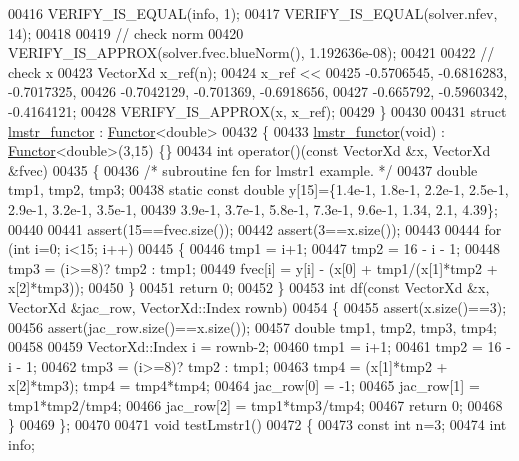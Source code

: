 \begin{DoxyCode}
00416   VERIFY\_IS\_EQUAL(info, 1);
00417   VERIFY\_IS\_EQUAL(solver.nfev, 14);
00418 
00419   \textcolor{comment}{// check norm}
00420   VERIFY\_IS\_APPROX(solver.fvec.blueNorm(), 1.192636e-08);
00421 
00422   \textcolor{comment}{// check x}
00423   VectorXd x\_ref(n);
00424   x\_ref <<
00425       -0.5706545,    -0.6816283,    -0.7017325,
00426       -0.7042129,     -0.701369,    -0.6918656,
00427       -0.665792,    -0.5960342,    -0.4164121;
00428   VERIFY\_IS\_APPROX(x, x\_ref);
00429 \}
00430 
00431 \textcolor{keyword}{struct }\hyperlink{structlmstr__functor}{lmstr\_functor} : \hyperlink{struct_functor}{Functor}<double>
00432 \{
00433     \hyperlink{structlmstr__functor}{lmstr\_functor}(\textcolor{keywordtype}{void}) : \hyperlink{struct_functor}{Functor}<double>(3,15) \{\}
00434     \textcolor{keywordtype}{int} operator()(\textcolor{keyword}{const} VectorXd &x, VectorXd &fvec)
00435     \{
00436         \textcolor{comment}{/*  subroutine fcn for lmstr1 example. */}
00437         \textcolor{keywordtype}{double} tmp1, tmp2, tmp3;
00438         \textcolor{keyword}{static} \textcolor{keyword}{const} \textcolor{keywordtype}{double} y[15]=\{1.4e-1, 1.8e-1, 2.2e-1, 2.5e-1, 2.9e-1, 3.2e-1, 3.5e-1,
00439             3.9e-1, 3.7e-1, 5.8e-1, 7.3e-1, 9.6e-1, 1.34, 2.1, 4.39\};
00440 
00441         assert(15==fvec.size());
00442         assert(3==x.size());
00443 
00444         \textcolor{keywordflow}{for} (\textcolor{keywordtype}{int} i=0; i<15; i++)
00445         \{
00446             tmp1 = i+1;
00447             tmp2 = 16 - i - 1;
00448             tmp3 = (i>=8)? tmp2 : tmp1;
00449             fvec[i] = y[i] - (x[0] + tmp1/(x[1]*tmp2 + x[2]*tmp3));
00450         \}
00451         \textcolor{keywordflow}{return} 0;
00452     \}
00453     \textcolor{keywordtype}{int} df(\textcolor{keyword}{const} VectorXd &x, VectorXd &jac\_row, VectorXd::Index rownb)
00454     \{
00455         assert(x.size()==3);
00456         assert(jac\_row.size()==x.size());
00457         \textcolor{keywordtype}{double} tmp1, tmp2, tmp3, tmp4;
00458 
00459         VectorXd::Index i = rownb-2;
00460         tmp1 = i+1;
00461         tmp2 = 16 - i - 1;
00462         tmp3 = (i>=8)? tmp2 : tmp1;
00463         tmp4 = (x[1]*tmp2 + x[2]*tmp3); tmp4 = tmp4*tmp4;
00464         jac\_row[0] = -1;
00465         jac\_row[1] = tmp1*tmp2/tmp4;
00466         jac\_row[2] = tmp1*tmp3/tmp4;
00467         \textcolor{keywordflow}{return} 0;
00468     \}
00469 \};
00470 
00471 \textcolor{keywordtype}{void} testLmstr1()
00472 \{
00473   \textcolor{keyword}{const} \textcolor{keywordtype}{int} n=3;
00474   \textcolor{keywordtype}{int} info;

\end{DoxyCode}
